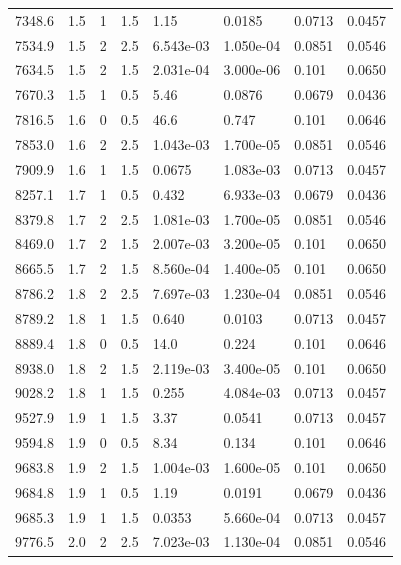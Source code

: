 \documentclass[preview]{standalone}
\begin{document}
{{{\begin{tabular}{L{1.2cm}C{1.2cm} C{0.3cm}C{0.5cm} C{1.4cm}C{1.4cm} C{1.4cm}C{1.4cm}}
  7348.6  &   1.5  & 1     & 1.5 &  1.15  & 0.0185  & 0.0713 &  0.0457   \\ 
  7534.9  &   1.5  & 2     & 2.5 &  6.543e-03  & 1.050e-04  & 0.0851 &  0.0546   \\ 
  7634.5  &   1.5  & 2     & 1.5 &  2.031e-04  & 3.000e-06  & 0.101 &  0.0650   \\ 
  7670.3  &   1.5  & 1     & 0.5 &  5.46  & 0.0876  & 0.0679 &  0.0436   \\ 
  7816.5  &   1.6  & 0     & 0.5 &  46.6  & 0.747  & 0.101 &  0.0646   \\ 
  7853.0  &   1.6  & 2     & 2.5 &  1.043e-03  & 1.700e-05  & 0.0851 &  0.0546   \\ 
  7909.9  &   1.6  & 1     & 1.5 &  0.0675  & 1.083e-03  & 0.0713 &  0.0457   \\ 
  8257.1  &   1.7  & 1     & 0.5 &  0.432  & 6.933e-03  & 0.0679 &  0.0436   \\ 
  8379.8  &   1.7  & 2     & 2.5 &  1.081e-03  & 1.700e-05  & 0.0851 &  0.0546   \\ 
  8469.0  &   1.7  & 2     & 1.5 &  2.007e-03  & 3.200e-05  & 0.101 &  0.0650   \\ 
  8665.5  &   1.7  & 2     & 1.5 &  8.560e-04  & 1.400e-05  & 0.101 &  0.0650   \\ 
  8786.2  &   1.8  & 2     & 2.5 &  7.697e-03  & 1.230e-04  & 0.0851 &  0.0546   \\ 
  8789.2  &   1.8  & 1     & 1.5 &  0.640  & 0.0103  & 0.0713 &  0.0457   \\ 
  8889.4  &   1.8  & 0     & 0.5 &  14.0  & 0.224  & 0.101 &  0.0646   \\ 
  8938.0  &   1.8  & 2     & 1.5 &  2.119e-03  & 3.400e-05  & 0.101 &  0.0650   \\ 
  9028.2  &   1.8  & 1     & 1.5 &  0.255  & 4.084e-03  & 0.0713 &  0.0457   \\ 
  9527.9  &   1.9  & 1     & 1.5 &  3.37  & 0.0541  & 0.0713 &  0.0457   \\ 
  9594.8  &   1.9  & 0     & 0.5 &  8.34  & 0.134  & 0.101 &  0.0646   \\ 
  9683.8  &   1.9  & 2     & 1.5 &  1.004e-03  & 1.600e-05  & 0.101 &  0.0650   \\ 
  9684.8  &   1.9  & 1     & 0.5 &  1.19  & 0.0191  & 0.0679 &  0.0436   \\ 
  9685.3  &   1.9  & 1     & 1.5 &  0.0353  & 5.660e-04  & 0.0713 &  0.0457   \\ 
  9776.5  &   2.0  & 2     & 2.5 &  7.023e-03  & 1.130e-04  & 0.0851 &  0.0546   \\ 

\end{tabular}}}}
\end{document}
